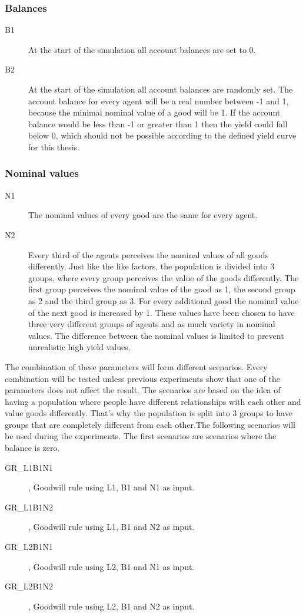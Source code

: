 \documentclass[twoside,openright]{uva-bachelor-thesis}
\begin{document}
\subsubsection{Balances}
\begin{description}
\item[B1]	At the start of the simulation all account balances are set to 0.
\item[B2]	At the start of the simulation all account balances are randomly set. The account balance for every agent will be a real number between -1 and 1, because the minimal nominal value of a good will be 1. If the account balance would be less than -1 or greater than 1 then the yield could fall below 0, which should not be possible according to the defined yield curve for this thesis.
\end{description}
\subsubsection{Nominal values}
\begin{description}
\item[N1]	The nominal values of every good are the same for every agent.
\item[N2]	Every third of the agents perceives the nominal values of all goods differently. Just like the like factors, the population is divided into 3 groups, where every group perceives the value of the goods differently. The first group perceives the nominal value of the good as 1, the second group as 2 and the third group as 3. For every additional good the nominal value of the next good is increased by 1. These values have been chosen to have three very different groups of agents and as much variety in nominal values. The difference between the nominal values is limited to prevent unrealistic high yield values.
\end{description} 
The combination of these parameters will form different scenarios. Every combination will be tested unless previous experiments show that one of the parameters does not affect the result. The scenarios are based on the idea of having a population where people have different relationships with each other and value goods differently. That’s why the population is split into 3 groups to have groups that are completely different from each other.The following scenarios will be used during the experiments.
The first scenarios are scenarios where the balance is zero.
\begin{description}
\item[GR\_L1B1N1], Goodwill rule using L1, B1 and N1 as input.
\item[GR\_L1B1N2], Goodwill rule using L1, B1 and N2 as input.
\item[GR\_L2B1N1], Goodwill rule using L2, B1 and N1 as input.
\item[GR\_L2B1N2], Goodwill rule using L2, B1 and N2 as input.
\end{description}
\end{document}
